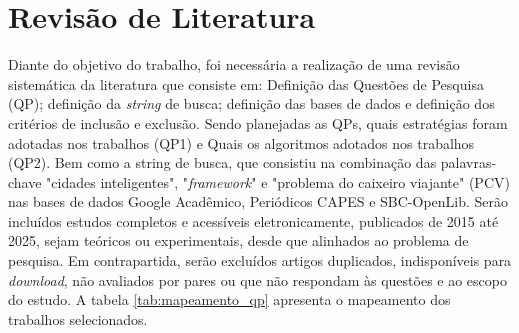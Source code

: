 \documentclass[conference,12pt]{IEEEtran}
\begin{document}
\section{Revisão de Literatura}
Diante do objetivo do trabalho, foi necessária a realização de uma revisão sistemática
da literatura que consiste em:
Definição das Questões de Pesquisa (QP); definição da \textit{string}
de busca; definição das bases de dados e definição dos critérios de inclusão e exclusão.
Sendo planejadas as QPs, quais estratégias foram adotadas nos trabalhos (QP1)
e Quais os algoritmos adotados nos trabalhos (QP2).
Bem como a string de busca, que consistiu na combinação
das palavras-chave "cidades inteligentes", "\textit{framework}" e "problema do caixeiro viajante" (PCV)
nas bases de dados Google Acadêmico, Periódicos CAPES e SBC-OpenLib.
Serão incluídos estudos completos e acessíveis
eletronicamente,
publicados de 2015 até 2025,
sejam teóricos ou experimentais,
desde que alinhados ao problema de pesquisa. Em contrapartida, serão excluídos
artigos duplicados, indisponíveis para \textit{download}, não avaliados por pares
ou que não respondam às questões e ao escopo do estudo.
A tabela \ref{tab:mapeamento_qp} apresenta o mapeamento dos trabalhos selecionados.
\end{document}
